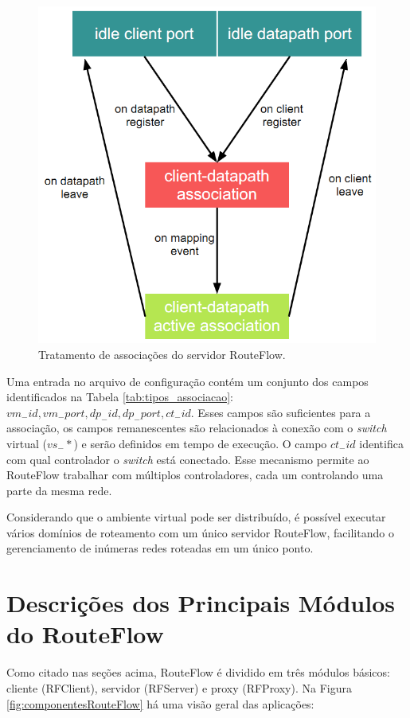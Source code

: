 \begin{figure}[h]
\centering
\includegraphics[width=120mm]{rfserverAssociacao.png}
\caption{Tratamento de associações do servidor RouteFlow.}
\label{fig:rfserverAssociacao} 
\end{figure}


Uma entrada no arquivo de configuração contém um conjunto 
dos campos identificados na Tabela \ref{tab:tipos_associacao}:
\textit{$vm_-id, vm_-port, dp_-id, dp_-port, ct_-id$}. Esses campos
são suficientes para a associação, os campos remanescentes
são relacionados à conexão com o \textit{switch} virtual ($vs_-*$) e serão
definidos em tempo de execução. O campo \textit{$ct_-id$} 
identifica com qual controlador o \textit{switch} está conectado. Esse
mecanismo permite ao RouteFlow trabalhar com múltiplos
controladores, cada um controlando uma parte da mesma rede.

Considerando que o ambiente virtual pode ser distribuído, é 
possível executar vários domínios de roteamento com um
único servidor RouteFlow, facilitando o gerenciamento de inúmeras 
redes roteadas em um único ponto.

\section{Descrições dos Principais Módulos do RouteFlow}
Como citado nas seções acima, RouteFlow é dividido em 
três módulos básicos: cliente (RFClient), servidor (RFServer)
 e proxy (RFProxy). Na Figura
\ref{fig:componentesRouteFlow} há uma visão geral das
aplicações:


